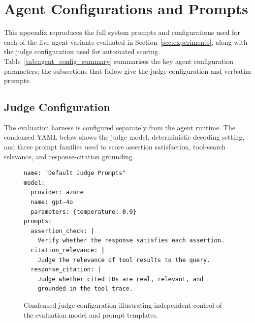 
\section{Agent Configurations and Prompts}
\label{app:prompts}

This appendix reproduces the full system prompts and configurations used for
each of the five agent variants evaluated in Section~\ref{sec:experiments},
along with the judge configuration used for automated scoring.
Table~\ref{tab:agent_config_summary} summarises the key agent configuration
parameters; the subsections that follow give the judge configuration and
verbatim prompts.

\subsection{Judge Configuration}
\label{app:judge-config}

The evaluation harness is configured separately from the agent runtime. The
condensed YAML below shows the judge model, deterministic decoding setting, and
three prompt families used to score assertion satisfaction, tool-search
relevance, and response-citation grounding.

\begin{figure}[htbp]
\centering
\begin{minipage}{0.92\linewidth}
\begin{lstlisting}[basicstyle=\color{blue}\small\ttfamily]
name: "Default Judge Prompts"
model:
  provider: azure
  name: gpt-4o
  parameters: {temperature: 0.0}
prompts:
  assertion_check: |
    Verify whether the response satisfies each assertion.
  citation_relevance: |
    Judge the relevance of tool results to the query.
  response_citation: |
    Judge whether cited IDs are real, relevant, and
    grounded in the tool trace.
\end{lstlisting}
\end{minipage}
\caption{Condensed judge configuration illustrating independent control of the evaluation model and prompt templates.}
\label{fig:app_judge_yaml}
\end{figure}

